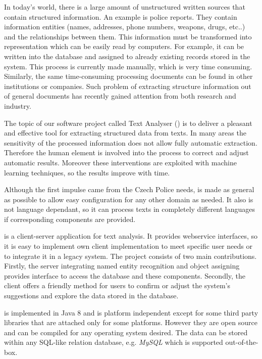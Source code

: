
In today's world, there is a large amount of unstructured written sources that contain structured information. An example is police reports. They contain
information entities (names, addresses, phone numbers, weapons, drugs, etc..)
and the relationships between them. This information must be transformed into
representation which can be easily read by computers. For example, it can be
written into the database and assigned to already existing records stored in
the system. This process is currently made manually, which is very time 
consuming. Similarly, the same time-consuming processing documents can be found
in other institutions or companies. Such problem of extracting structure
information out of general documents has recently gained attention from both
research and industry.

The topic of our software project called Text Analyser (\textan{}) is to
deliver a pleasant and effective tool for extracting structured data from texts.
In many areas the sensitivity of the processed information does not allow fully
automatic extraction. Therefore the human element is involved into the process
to correct and adjust automatic results. Moreover these interventions are
exploited with machine learning techniques, so the results improve with time.

Although the first impulse came from the Czech Police needs, \textan{} is made
as general as possible to allow easy configuration for any other domain as
needed. It also is not language dependant, so it can process texts in completely
different languages if corresponding components are provided.

\textan{} is a client-server application for text analysis. It provides
webservice interfaces, so it is easy to implement own client implementation to
meet specific user needs or to integrate it in a legacy system. The project
consists of two main contributions. Firstly, the server integrating named entity
recognition and object assigning provides interface to access the database and
these components. Secondly, the client offers a friendly method for users to
confirm or adjust the system's suggestions and explore the data stored in the
database.

\textan{} is implemented in Java 8 and is platform independent except for some
third party libraries that are attached only for some platforms. However they are
open source and can be compiled for any operating system desired. The data can be
stored within any SQL-like relation database, e.g. \emph{MySQL} which is supported
out-of-the-box.
